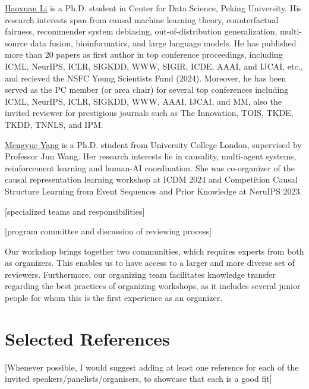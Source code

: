 \documentclass{article}
\begin{document}
\href{https://scholar.google.com/citations?user=gtDqiucAAAAJ&hl=en}{Haoxuan Li} is a Ph.D. student in Center for Data Science, Peking University. His research interests span from causal machine learning theory, counterfactual fairness, recommender system debiasing, out-of-distribution generalization, multi-source data fusion, bioinformatics, and large language models. He has published more than 20 papers as first author in top conference
proceedings, including ICML, NeurIPS, ICLR, SIGKDD, WWW, SIGIR, ICDE, AAAI, and IJCAI, etc., and recieved the NSFC Young Scientists Fund (2024). Moreover, he has been served as the PC member (or area chair) for several top conferences including ICML, NeurIPS, ICLR, SIGKDD, WWW, AAAI, IJCAI, and MM, also the invited reviewer for prestigious journals such as The Innovation, TOIS, TKDE, TKDD, TNNLS, and IPM.

\href{https://ymy4323460.github.io/}{Mengyue Yang} is a Ph.D. student from University College London, supervised by Professor Jun Wang. Her research interests lie in causality, multi-agent systems, reinforcement learning and human-AI coordination. She was co-organizer of the causal representation learning workshop at ICDM 2024 and Competition Causal Structure Learning from Event Sequences and Prior Knowledge at NeruIPS 2023.

[specialized teams and responsibilities]

[program committee and discussion of reviewing process]

    Our workshop brings together two communities, which requires experts from both as organizers. This enables us to have access to a larger and more diverse set of reviewers. Furthermore, our organizing team facilitates knowledge transfer regarding the best practices of organizing workshops, as it includes several junior people for whom this is the first experience as an organizer. 

\section{Selected References}

{\color{blue}[Whenever possible, I would suggest adding at least one reference for each of the invited speakers/panelists/organisers, to showcase that each is a good fit]}
\end{document}
